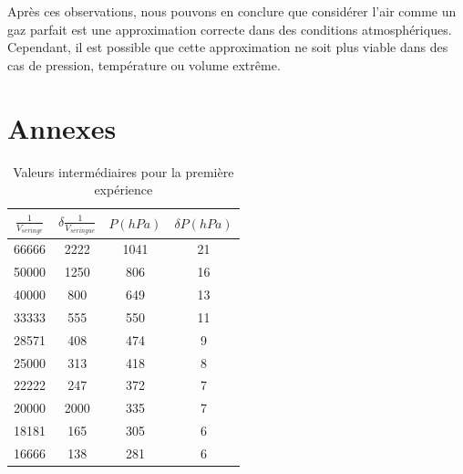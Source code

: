 \documentclass[12pt]{article}
\begin{document}
Après ces observations, nous pouvons en conclure que considérer l'air comme un gaz parfait est une approximation correcte dans des conditions atmosphériques. Cependant, il est possible que cette approximation
ne soit plus viable dans des cas de pression, température ou volume extrême. 


\newpage
\section*{Annexes}
\begin{table}[h!]
\begin{center}
\begin{tabular}{|c|c|c|c|}
\hline
         $\frac{1}{V_{seringe}}$ &    $\delta \frac{1}{V_{seringue}}$ &  $P(hPa)$ &  $\delta P(hPa)$ \\
\hline
66666 & 2222 &                    1041 &           21 \\
50000 & 1250 &                     806 &           16 \\
40000 &  800 &                     649 &           13 \\
33333 &  555 &                     550 &           11 \\
28571 &  408 &                     474 &            9 \\
25000 &  313 &                     418 &            8 \\
22222 &  247 &                     372 &            7 \\
20000 &  2000 &                     335 &            7 \\
18181 &  165 &                     305 &            6 \\
16666 &  138 &                     281 &            6 \\
\hline
\end{tabular}
\end{center}
\label{Table1annexes}
\caption{Valeurs intermédiaires pour la première expérience}
\end{table}
\end{document}
